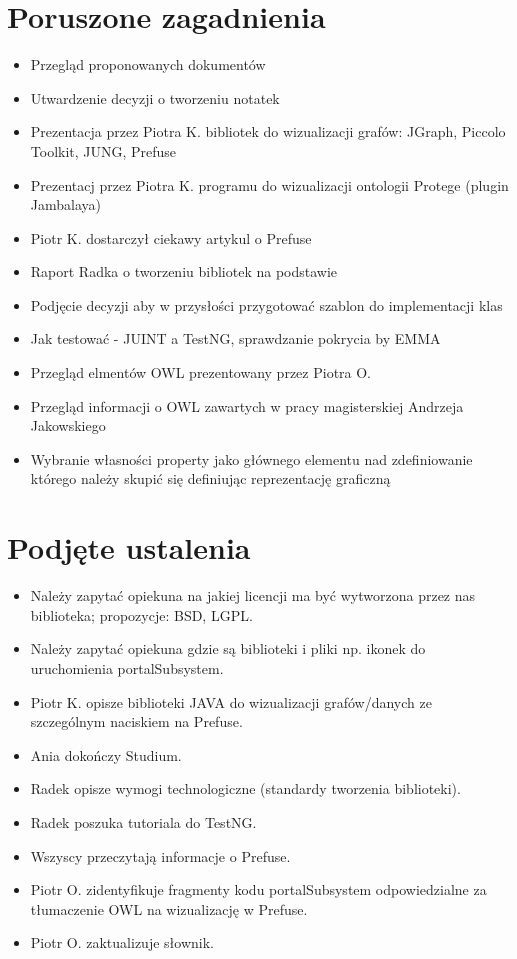 \documentclass[a4paper,10pt]{article}
\begin{document}
\section{Poruszone zagadnienia}
\begin{itemize}
 	\item Przegląd proponowanych dokumentów
	\item Utwardzenie decyzji o tworzeniu notatek
	\item Prezentacja przez Piotra K. bibliotek do wizualizacji grafów: JGraph, Piccolo Toolkit, JUNG, Prefuse
	\item Prezentacj przez Piotra K. programu do wizualizacji ontologii Protege (plugin Jambalaya) 
	\item Piotr K. dostarczył ciekawy artykul o Prefuse \cite{art}
	\item Raport Radka o tworzeniu bibliotek na podstawie  \cite{pdfik}
	\item Podjęcie decyzji aby w przysłości przygotować szablon do implementacji klas
	\item Jak testować - JUINT a TestNG, \cite{linczek}  sprawdzanie pokrycia by EMMA \cite{innylinczke}
	\item  Przegląd elmentów OWL prezentowany przez Piotra O. \cite{linkW3c}	
	\item Przegląd informacji o OWL zawartych w pracy magisterskiej Andrzeja Jakowskiego \cite{pracka}
	\item Wybranie własności property jako głównego elementu nad zdefiniowanie którego należy skupić się definiując reprezentację graficzną
	   
\end{itemize}


\section{Podjęte ustalenia}
\begin{itemize}
 	\item Należy zapytać opiekuna na jakiej licencji ma być wytworzona przez nas biblioteka; propozycje: BSD, LGPL. 
	\item Należy zapytać opiekuna gdzie są biblioteki i pliki np. ikonek do uruchomienia portalSubsystem.
	\item Piotr K. opisze biblioteki JAVA do wizualizacji grafów/danych ze szczególnym naciskiem na Prefuse.
	\item Ania dokończy Studium.
	\item Radek opisze wymogi technologiczne (standardy tworzenia biblioteki).
	\item Radek poszuka tutoriala do TestNG.
	\item Wszyscy przeczytają informacje o Prefuse.
	\item Piotr O. zidentyfikuje fragmenty kodu portalSubsystem odpowiedzialne za tłumaczenie OWL na wizualizację w Prefuse.
	\item Piotr O. zaktualizuje słownik.
\end{itemize}





\clearpage
{}
{}

\end{document}
